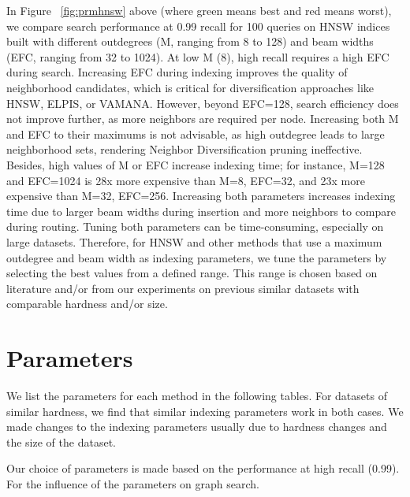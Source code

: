 In Figure ~\ref{fig:prmhnsw} above (where green means best and red means worst), we compare search performance at
0.99 recall for 100 queries on HNSW indices built with different outdegrees (M, ranging from 8 to 128) and beam widths (EFC,
ranging from 32 to 1024). At low M (8), high recall requires a high EFC during search. Increasing EFC during indexing improves the
quality of neighborhood candidates, which is critical for diversification approaches like HNSW, ELPIS, or VAMANA. However,
beyond EFC=128, search efficiency does not improve further, as more neighbors are required per node. Increasing both M and EFC
to their maximums is not advisable, as high outdegree leads to large neighborhood sets, rendering Neighbor Diversification pruning
ineffective. Besides, high values of M or EFC increase indexing time; for instance, M=128 and EFC=1024 is 28x more expensive
than M=8, EFC=32, and 23x more expensive than M=32, EFC=256. Increasing both parameters increases indexing time due to
larger beam widths during insertion and more neighbors to compare during routing. Tuning both parameters can be time-consuming,
especially on large datasets. Therefore, for HNSW and other methods that use a maximum outdegree and beam width as indexing
parameters, we tune the parameters by selecting the best values from a defined range. This range is chosen based on literature and/or from our experiments on previous similar datasets with comparable hardness and/or size.

\section*{Parameters}

We list the parameters for each method in the following tables. For datasets of similar hardness, we find that similar indexing parameters work in both cases. We made changes to the indexing parameters usually due to hardness changes and the size of the dataset.

Our choice of parameters is made based on the performance at high recall (0.99). For the influence of the parameters on graph search.


